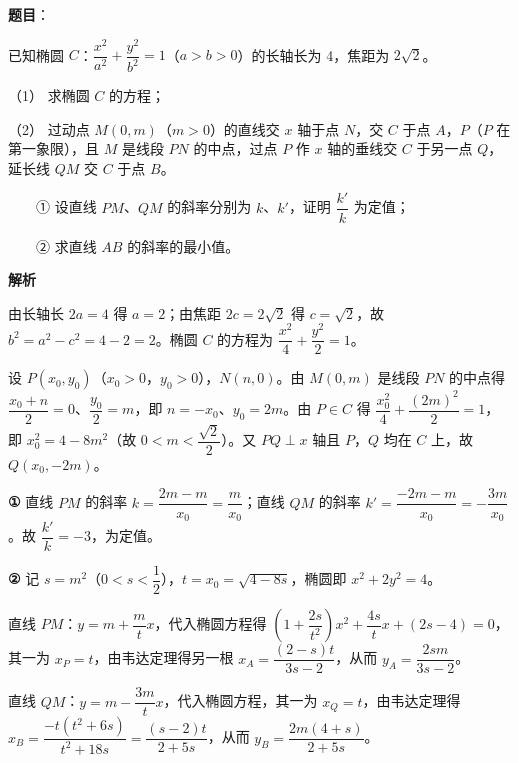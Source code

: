 \begin{answer}

\textbf{题目}：

已知椭圆 \(C\)：\(\dfrac{x^2}{a^2}+\dfrac{y^2}{b^2}=1\)（\(a>b>0\)）的长轴长为 4，焦距为 \(2\sqrt{2}\)。

（1） 求椭圆 \(C\) 的方程；

（2） 过动点 \(M(0,m)\)（\(m>0\)）的直线交 \(x\) 轴于点 \(N\)，交 \(C\) 于点 \(A\)，\(P\)（\(P\) 在第一象限），且 \(M\) 是线段 \(PN\) 的中点，过点 \(P\) 作 \(x\) 轴的垂线交 \(C\) 于另一点 \(Q\)，延长线 \(QM\) 交 \(C\) 于点 \(B\)。

　　① 设直线 \(PM\)、\(QM\) 的斜率分别为 \(k\)、\(k'\)，证明 \(\dfrac{k'}{k}\) 为定值；

　　② 求直线 \(AB\) 的斜率的最小值。
\nopagebreak[4]
\begin{center}\end{center}
\nopagebreak[4]
\textbf{解析}


由长轴长 \(2a=4\) 得 \(a=2\)；由焦距 \(2c=2\sqrt{2}\) 得 \(c=\sqrt{2}\)，故 \(b^{2}=a^{2}-c^{2}=4-2=2\)。椭圆 \(C\) 的方程为 \(\dfrac{x^{2}}{4}+\dfrac{y^{2}}{2}=1\)。


设 \(P(x_{0},y_{0})\)（\(x_{0}>0\)，\(y_{0}>0\)），\(N(n,0)\)。由 \(M(0,m)\) 是线段 \(PN\) 的中点得 \(\dfrac{x_{0}+n}{2}=0\)、\(\dfrac{y_{0}}{2}=m\)，即 \(n=-x_{0}\)、\(y_{0}=2m\)。由 \(P\in C\) 得 \(\dfrac{x_{0}^{2}}{4}+\dfrac{(2m)^{2}}{2}=1\)，即 \(x_{0}^{2}=4-8m^{2}\)（故 \(0<m<\dfrac{\sqrt{2}}{2}\)）。又 \(PQ\perp x\) 轴且 \(P\)，\(Q\) 均在 \(C\) 上，故 \(Q(x_{0},-2m)\)。

\textbf{①} 直线 \(PM\) 的斜率 \(k=\dfrac{2m-m}{x_{0}}=\dfrac{m}{x_{0}}\)；直线 \(QM\) 的斜率 \(k'=\dfrac{-2m-m}{x_{0}}=-\dfrac{3m}{x_{0}}\)。故 \(\dfrac{k'}{k}=-3\)，为定值。

\textbf{②} 记 \(s=m^{2}\)（\(0<s<\dfrac{1}{2}\)），\(t=x_{0}=\sqrt{4-8s}\)，椭圆即 \(x^{2}+2y^{2}=4\)。

直线 \(PM\)：\(y=m+\dfrac{m}{t}x\)，代入椭圆方程得 \(\left(1+\dfrac{2s}{t^{2}}\right)x^{2}+\dfrac{4s}{t}x+(2s-4)=0\)，其一为 \(x_{P}=t\)，由韦达定理得另一根 \(x_{A}=\dfrac{(2-s)t}{3s-2}\)，从而 \(y_{A}=\dfrac{2sm}{3s-2}\)。

直线 \(QM\)：\(y=m-\dfrac{3m}{t}x\)，代入椭圆方程，其一为 \(x_{Q}=t\)，由韦达定理得 \(x_{B}=\dfrac{-t(t^{2}+6s)}{t^{2}+18s}=\dfrac{(s-2)t}{2+5s}\)，从而 \(y_{B}=\dfrac{2m(4+s)}{2+5s}\)。


\end{answer}
